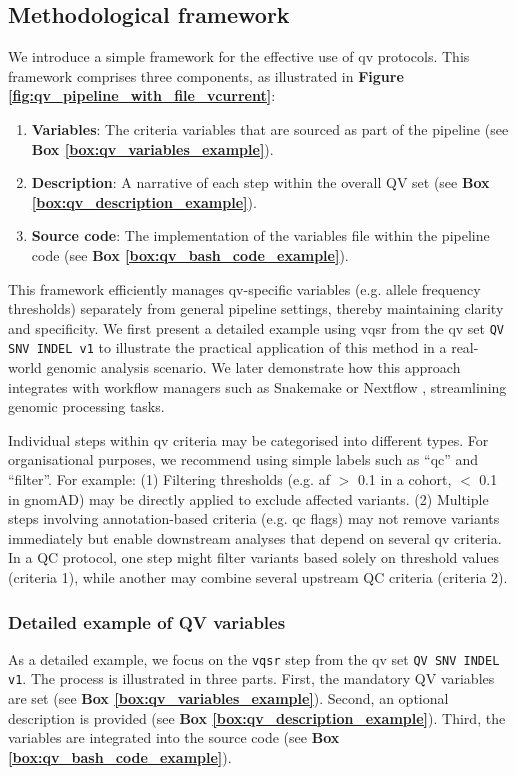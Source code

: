 \subsection{Methodological framework} \label{sec:framework}
We introduce a simple framework for the effective use of \ac{qv}  protocols. This framework comprises three components, as illustrated in \textbf{Figure \ref{fig:qv_pipeline_with_file_vcurrent}}:
\begin{enumerate}
    \item \textbf{Variables}: The criteria variables that are sourced as part of the pipeline (see \textbf{Box \ref{box:qv_variables_example}}).
    \item \textbf{Description}: A narrative of each step within the overall QV set (see \textbf{Box \ref{box:qv_description_example}}).
    \item \textbf{Source code}: The implementation of the variables file within the pipeline code (see \textbf{Box \ref{box:qv_bash_code_example}}).
\end{enumerate}

This framework efficiently manages \ac{qv}-specific variables (e.g. allele frequency thresholds) separately from general pipeline settings, thereby maintaining clarity and specificity. We first present a detailed example using \ac{vqsr} from the \ac{qv} set \colorbox{colorSUNSET2!60}{\texttt{QV SNV INDEL v1}} to illustrate the practical application of this method in a real-world genomic analysis scenario. We later demonstrate how this approach integrates with workflow managers such as Snakemake \cite{molder_sustainable_2021} or Nextflow \cite{di_tommaso_nextflow_2017}, streamlining genomic processing tasks.

Individual steps within \ac{qv} criteria may be categorised into different types. For organisational purposes, we recommend using simple labels such as ``\ac{qc}'' and ``filter''. For example: (1) Filtering thresholds (e.g. \ac{af} $>$ 0.1 in a cohort, $<$ 0.1 in gnomAD) may be directly applied to exclude affected variants. (2) Multiple steps involving annotation-based criteria (e.g. \ac{qc} flags) may not remove variants immediately but enable downstream analyses that depend on several \ac{qv} criteria.
In a QC protocol, one step might filter variants based solely on threshold values (criteria 1), while another may combine several upstream QC criteria (criteria 2).

\subsubsection{Detailed example of QV variables}\label{sec:protocol_variables_example}
As a detailed example, we focus on the \colorbox{kispiblue!30}{\texttt{vqsr}} step from the \ac{qv} set \colorbox{colorSUNSET2!60}{\texttt{QV SNV INDEL v1}}. The process is illustrated in three parts.
First, the mandatory QV variables are set (see \textbf{Box \ref{box:qv_variables_example}}).
Second, an optional description is provided (see \textbf{Box \ref{box:qv_description_example}}).
Third, the variables are integrated into the source code (see \textbf{Box \ref{box:qv_bash_code_example}}).


